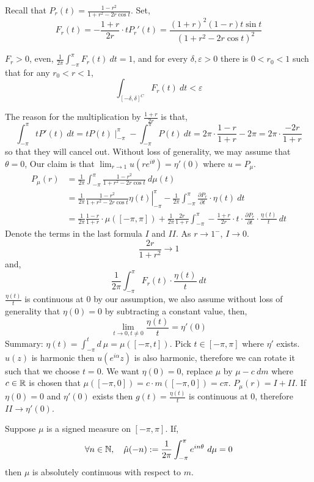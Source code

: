 Recall that $P_r(t) = \frac{1 - r^2}{1 + r^2 - 2 r \cos t}$.
Set,
\[
	F_r(t) = -\frac{1 + r}{2 r} \cdot t P_r'(t)
	= \frac{{(1 + r)}^2 (1 - r) t \sin t}{{(1 + r^2 - 2 r \cos t)}^2}
\]
\begin{lemma}
	$F_r > 0$, even, $\frac{1}{2 \pi} \int_{-\pi}^{\pi} F_r(t)\ d t = 1$, and for every $\delta, \varepsilon > 0$ there is $0 < r_0 < 1$ such that for any $r_0 < r < 1$,
	\[
		\int_{{[-\delta, \delta]}^C} F_r(t)\ dt < \varepsilon
	\]
\end{lemma}
The reason for the multiplication by $\frac{1 + r}{2 r}$ is that,
\[
	\int_{-\pi}^{\pi} t P'(t)\ dt
	= t P(t) \mid_{-\pi}^{\pi} - \int_{-\pi}^{\pi} P(t)\ dt
	= 2 \pi \cdot \frac{1 - r}{1 + r} - 2 \pi
	= 2 \pi \cdot \frac{-2 r}{1 + r}
\]
so that they will cancel out.
Without loss of generality, we may assume that $\theta = 0$,
Our claim is that $\lim_{r \to 1} u(r e^{i \theta}) = \eta'(0)$ where $u = P_{\mu}$.
\begin{align*}
	P_{\mu}(r)
	& = \frac{1}{2 \pi} \int_{-\pi}^{\pi} \frac{1 - r^2}{1 + r^2 - 2 r \cos t}\ d \mu(t) \\
	& = \frac{1}{2 \pi} \left. \frac{1 - r^2}{1 + r^2 - 2 r \cos t} \eta(t) \right\rvert_{-\pi}^{\pi} - \frac{1}{2 \pi} \int_{-\pi}^{\pi} \frac{\partial P_r}{\partial t} \cdot \eta(t)\ dt \\
	& = \frac{1}{2 \pi} \frac{1 - r}{1 + r} \cdot \mu([-\pi, \pi]) + \frac{1}{2 \pi} \frac{2 r}{1 + r} \int_{-\pi}^{\pi} -\frac{1 + r}{2 r} \cdot t \cdot \frac{\partial P_r}{\partial t} \cdot \frac{\eta(t)}{t}\ dt
\end{align*}
Denote the terms in the last formula $I$ and $I\!I$. As $r \to 1^-$, $I \to 0$.
\[
	\frac{2 r}{1 + r^2} \to 1
\]
and,
\[
	\frac{1}{2 \pi} \int_{-\pi}^{\pi} F_r(t) \cdot \frac{\eta(t)}{t}\ dt
\]
$\frac{\eta(t)}{t}$ is continuous at $0$ by our assumption,
we also assume without loss of generality that $\eta(0) = 0$ by subtracting a constant value, then,
\[
	\lim_{t \to 0, t \ne 0} \frac{\eta(t)}{t}
	= \eta'(0)
\]
Summary:
$\eta(t) = \int_{-\pi}^t d\ \mu = \mu([-\pi, t])$. Pick $t \in [-\pi, \pi]$ where $\eta'$ exists.
$u(z)$ is harmonic then $u(e^{i \alpha} z)$ is also harmonic, therefore we can rotate it such that we choose $t = 0$.
We want $\eta(0) = 0$, replace $\mu$ by $\mu - c\ dm$ where $c \in \mathbb{R}$ is chosen that $\mu([-\pi, 0]) = c \cdot m([-\pi, 0]) = c \pi$.
$P_{\mu}(r) = I + I\!I$. If $\eta(0) = 0$ and $\eta'(0)$ exists then $g(t) = \frac{\eta(t)}{t}$ is continuous at $0$, therefore $I\!I \to \eta'(0)$.
\begin{theorem}[F \& M. Riesz]
	Suppose $\mu$ is a signed measure on $[-\pi, \pi]$. If,
	\[
		\forall n \in \mathbb{N},
		\quad
		\hat{\mu}(-n) : = \frac{1}{2 \pi} \int_{-\pi}^{\pi} e^{i n \theta}\ d \mu = 0
	\]
	then $\mu$ is absolutely continuous with respect to $m$.
\end{theorem}

